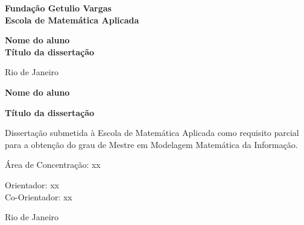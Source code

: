 \documentclass[12pt]{article}
\begin{document}
\begin{titlepage}
\begin{center}
\textbf{\LARGE Fundação Getulio Vargas}\\ 
\textbf{\LARGE Escola de Matemática Aplicada}

\par
\vspace{170pt}
\textbf{\Large Nome do aluno}\\
\vspace{32pt}
\textbf{\Large Título da dissertação}\\
\end{center}

\par
\vfill
\begin{center}
{{\normalsize Rio de Janeiro}\\
{\normalsize \the\year}}
\end{center}
\end{titlepage}

\thispagestyle{empty}

\newpage
\begin{center}
\textbf{\LARGE Nome do aluno}

\par
\vspace{200pt}
\textbf{\Large Título da dissertação}
\end{center}

\par
\vspace{85pt}
\hspace*{175pt}\parbox{7.6cm}{{\normalsize Dissertação submetida à Escola de Matemática Aplicada como requisito parcial para a obtenção do grau de Mestre em Modelagem Matemática da Informação.}}

\par
\vspace{1em}
\hspace*{125pt}\parbox{10.0cm}{{\normalsize Área de Concentração: xx}}

\par
\vspace{1em}
\hspace*{125pt}\parbox{10.0cm}{{\normalsize Orientador: xx}\\
{\normalsize Co-Orientador: xx}}

\par
\vfill
\begin{center}
{{\normalsize Rio de Janeiro}\\
{\normalsize \the\year}}
\end{center}
\end{document}
